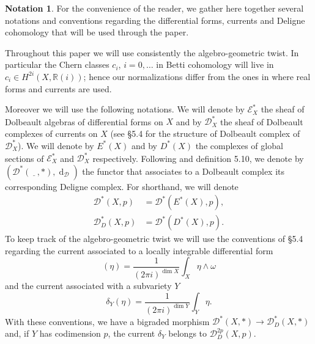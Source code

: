 \documentclass[10pt,twoside]{article}
\numberwithin{equation}{section}
\theoremstyle{plain}
\theoremstyle{definition}
\newtheorem{notation}[equation]{Notation}
\DeclareMathOperator{\dd}{d}
\begin{document}
\begin{notation}\label{def:19}
  For the convenience of the reader, we gather here together several
  notations and conventions regarding the differential forms, currents
  and Deligne cohomology that will be used through the paper.

  Throughout this paper we will use consistently the algebro-geometric
  twist. In particular the Chern classes $c_{i}$, $i=0,\dots$ in Betti
  cohomology will live in $c_{i}\in H^{2i}(X,\mathbb{R}(i))$; hence
  our normalizations differ from the ones in \cite{GilletSoule:ait}
  where real forms and currents are used.

  Moreover we will use the following notations.  We will denote by
  $\mathscr{E}^{\ast}_{X}$ the sheaf of Dolbeault algebras of
  differential forms on $X$ and by $\mathscr{D}^{\ast}_{X}$ the sheaf
  of Dolbeault complexes of currents on $X$ (see
  \cite{BurgosKramerKuehn:cacg} \S 5.4 for the structure of Dolbeault
  complex of $\mathscr{D}^{\ast}_{X}$).  We will denote by
  $E^{\ast}(X)$ and by $D^{\ast}(X)$ the complexes of global sections
  of $\mathscr{E}^{\ast}_{X}$ and $\mathscr{D}^{\ast}_{X}$
  respectively.  Following \cite{Burgos:CDB} and
  \cite{BurgosKramerKuehn:cacg} definition 5.10, we denote by
  $(\mathcal{D}^{\ast}(\underline{\phantom{A}},\ast),\dd_{\mathcal{D}})$
  the functor that associates to a Dolbeault complex its corresponding
  Deligne complex. For shorthand, we will denote
  \begin{align*}
    \mathcal{D}^{\ast}(X,p)&=\mathcal{D}^{\ast}(E^{\ast }(X),p),\\
    \mathcal{D}^{\ast}_{D}(X,p)&=\mathcal{D}^{\ast}(D^{\ast }(X),p).
  \end{align*}
  To keep track of the algebro-geometric twist we will use the
  conventions of 
  \cite{BurgosKramerKuehn:cacg} \S 5.4 regarding the current
  associated to a locally integrable differential form
  \begin{displaymath}
    [\omega ](\eta)=\frac{1}{(2\pi i)^{\dim X}}\int_{X}\eta\land \omega
  \end{displaymath}
  and the current associated with a subvariety $Y$
  \begin{displaymath}
    \delta _{Y}(\eta)=\frac{1}{(2\pi i)^{\dim Y}}\int_{Y}\eta.
  \end{displaymath}
  With these conventions, we have a bigraded morphism 
  $\mathcal{D}^{\ast}(X,\ast)\to \mathcal{D}^{\ast}_{D}(X,\ast)$ and,
  if $Y$ has codimension $p$, the current $\delta _{Y}$ belongs to 
  $\mathcal{D}^{2p}_{D}(X,p)$.

\end{notation}
\end{document}
